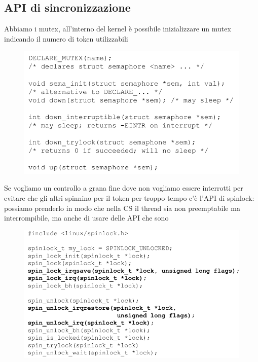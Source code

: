 \documentclass[12pt, oneside]{extbook}
\begin{document}
\subsection{API di sincronizzazione}
Abbiamo i mutex, all'interno del kernel è possibile inizializzare un mutex indicando il numero di token utilizzabili
\begin{figure}[!h]
	\includegraphics[scale=0.4]{immagini/mutex_api.png}
\end{figure}
Se vogliamo un controllo a grana fine dove non vogliamo essere interrotti per evitare che gli altri spinnino per il token per troppo tempo c'è l'API di spinlock: possiamo prenderlo in modo che nella CS il thread sia non preemptabile ma interrompibile, ma anche di usare delle API che sono
\begin{figure}[!h]
	\includegraphics[scale=0.4]{immagini/spinlock_api.png}
\end{figure}
\end{document}
